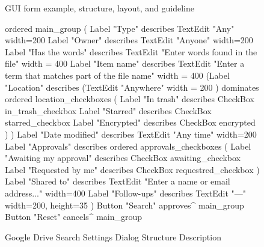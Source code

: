 \begin{figure}[t]
{{}}
\vskip5mm

\caption{GUI form example, structure, layout, and guideline}
\label{form1-structure-layout}
\end{figure}



\begin{figure}[t]
\begin{verbnobox}[\fontsize{10pt}{10pt}\selectfont]
ordered main_group (
  Label "Type" describes TextEdit "Any" {width=200}
  Label "Owner" describes TextEdit "Anyone" {width=200}
  Label "Has the words" describes TextEdit "Enter words found in the file" {
   width = 400
  }
  Label "Item name" describes
    TextEdit "Enter a term that matches part of the file name" {
      width = 400
    }
  (Label "Location" describes
    (TextEdit "Anywhere" { width = 200 }) dominates
    ordered location_checkboxes (
      Label "In trash"  describes CheckBox in_trash_checkbox
      Label "Starred"   describes CheckBox starred_checkbox
      Label "Encrypted" describes CheckBox encrypted
    )
  )
  Label "Date modified" describes  TextEdit "Any time" {width=200}
  Label "Approvals" describes
    ordered approvals_checkboxes (
      Label "Awaiting my approval" describes CheckBox awaiting_checkbox
      Label "Requested by me" describes CheckBox requestred_checkbox
  )
  Label "Shared to" describes
    TextEdit "Enter a name or email address..." {width=400}
  Label "Follow-ups" describes TextEdit "---" {width=200, height=35}
)
Button "Search" approves^ main_group
Button "Reset" cancels^ main_group
\end{verbnobox}
\caption{Google Drive Search Settings Dialog Structure Description}
\label{gd_structure}
\end{figure}

